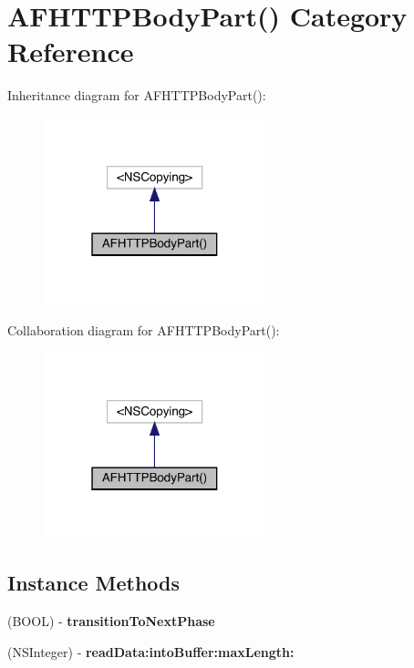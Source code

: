 \hypertarget{category_a_f_h_t_t_p_body_part_07_08}{}\section{A\+F\+H\+T\+T\+P\+Body\+Part() Category Reference}
\label{category_a_f_h_t_t_p_body_part_07_08}


Inheritance diagram for A\+F\+H\+T\+T\+P\+Body\+Part()\+:\nopagebreak
\begin{figure}[H]
\begin{center}
\leavevmode
\includegraphics[width=183pt]{category_a_f_h_t_t_p_body_part_07_08__inherit__graph}
\end{center}
\end{figure}


Collaboration diagram for A\+F\+H\+T\+T\+P\+Body\+Part()\+:\nopagebreak
\begin{figure}[H]
\begin{center}
\leavevmode
\includegraphics[width=183pt]{category_a_f_h_t_t_p_body_part_07_08__coll__graph}
\end{center}
\end{figure}
\subsection*{Instance Methods}
\begin{DoxyCompactItemize}
\item 
\mbox{\label{category_a_f_h_t_t_p_body_part_07_08_a7a1d3c4cecb39d49eacd5d93a6ec0e53}} 
(B\+O\+OL) -\/ {\bfseries transition\+To\+Next\+Phase}
\item 
\mbox{\label{category_a_f_h_t_t_p_body_part_07_08_a2554c5b61f1950a9218a217b267110c5}} 
(N\+S\+Integer) -\/ {\bfseries read\+Data\+:into\+Buffer\+:max\+Length\+:}
\end{DoxyCompactItemize}
